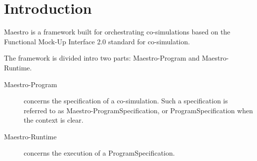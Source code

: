 \section{Introduction}\label{sec:intro}

Maestro is a framework built for orchestrating co-simulations based on the
Functional Mock-Up Interface 2.0 standard for co-simulation.

The framework is divided intro two parts: Maestro-Program and Maestro-Runtime.
\begin{description}
    \item[Maestro-Program] concerns the specification of a co-simulation. Such a
    specification is referred to as Maestro-ProgramSpecification, or ProgramSpecification
    when the context is clear.
  \item[Maestro-Runtime] concerns the execution of a ProgramSpecification.
    \end{description}

